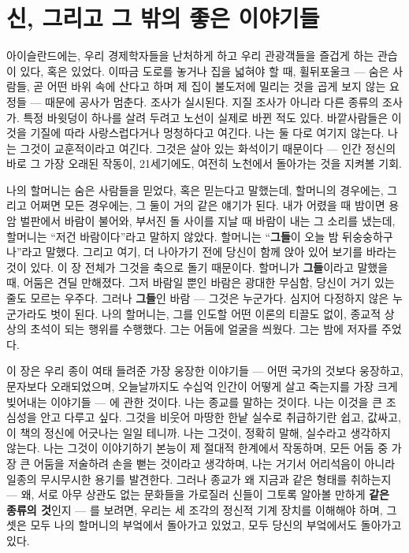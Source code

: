 \chapter{신, 그리고 그 밖의 좋은 이야기들}

아이슬란드에는, 우리 경제학자들을 난처하게 하고 우리 관광객들을 즐겁게 하는 관습이 있다, 혹은 있었다. 이따금 도로를 놓거나 집을 넓혀야 할 때, 휠뒤포울크 — 숨은 사람들, 곧 어떤 바위 속에 산다고 하며 제 집이 불도저에 밀리는 것을 곱게 보지 않는 요정들 — 때문에 공사가 멈춘다. 조사가 실시된다. 지질 조사가 아니라 다른 종류의 조사가. 특정 바윗덩이 하나를 살려 두려고 노선이 실제로 바뀐 적도 있다. 바깥사람들은 이것을 기질에 따라 사랑스럽다거나 멍청하다고 여긴다. 나는 둘 다로 여기지 않는다. 나는 그것이 교훈적이라고 여긴다. 그것은 살아 있는 화석이기 때문이다 — 인간 정신의 바로 그 가장 오래된 작동이, 21세기에도, 여전히 노천에서 돌아가는 것을 지켜볼 기회.

나의 할머니는 숨은 사람들을 믿었다, 혹은 믿는다고 말했는데, 할머니의 경우에는, 그리고 어쩌면 모든 경우에는, 그 둘이 거의 같은 얘기가 된다. 내가 어렸을 때 밤이면 용암 벌판에서 바람이 불어와, 부서진 돌 사이를 지날 때 바람이 내는 그 소리를 냈는데, 할머니는 ``저건 바람이다''라고 말하지 않았다. 할머니는 ``\textbf{그들}이 오늘 밤 뒤숭숭하구나''라고 말했다. 그리고 여기, 더 나아가기 전에 당신이 함께 앉아 있어 보기를 바라는 것이 있다. 이 장 전체가 그것을 축으로 돌기 때문이다. 할머니가 \textbf{그들}이라고 말했을 때, 어둠은 견딜 만해졌다. 그저 바람일 뿐인 바람은 광대한 무심함, 당신이 거기 있는 줄도 모르는 우주다. 그러나 \textbf{그들}인 바람 — 그것은 누군가다. 심지어 다정하지 않은 누군가라도 벗이 된다. 나의 할머니는, 그를 인도할 어떤 이론의 티끌도 없이, 종교적 상상의 초석이 되는 행위를 수행했다. 그는 어둠에 얼굴을 씌웠다. 그는 밤에 저자를 주었다.

이 장은 우리 종이 여태 들려준 가장 웅장한 이야기들 — 어떤 국가의 것보다 웅장하고, 문자보다 오래되었으며, 오늘날까지도 수십억 인간이 어떻게 살고 죽는지를 가장 크게 빚어내는 이야기들 — 에 관한 것이다. 나는 종교를 말하는 것이다. 나는 이것을 큰 조심성을 안고 다루고 싶다. 그것을 비웃어 마땅한 한낱 실수로 취급하기란 쉽고, 값싸고, 이 책의 정신에 어긋나는 일일 테니까. 나는 그것이, 정확히 말해, 실수라고 생각하지 않는다. 나는 그것이 이야기하기 본능이 제 절대적 한계에서 작동하며, 모든 어둠 중 가장 큰 어둠을 저술하려 손을 뻗는 것이라고 생각하며, 나는 거기서 어리석음이 아니라 일종의 무시무시한 용기를 발견한다. 그러나 종교가 왜 지금과 같은 형태를 취하는지 — 왜, 서로 아무 상관도 없는 문화들을 가로질러 신들이 그토록 알아볼 만하게 \textbf{같은 종류의 것}인지 — 를 보려면, 우리는 세 조각의 정신적 기계 장치를 이해해야 하며, 그 셋은 모두 나의 할머니의 부엌에서 돌아가고 있었고, 모두 당신의 부엌에서도 돌아가고 있다.

